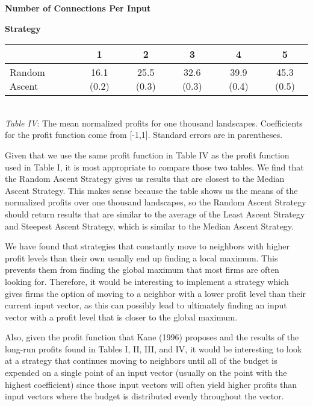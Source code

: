 \begin{center}
\hspace{2cm} \textbf{Number of Connections Per Input}
\begin{flushleft}
\hspace{2.5cm} \textbf{Strategy}
\end{flushleft}
\begin{Schunk}

\begin{tabular}{l|c|c|c|c|c}
\hline
  & 1 & 2 & 3 & 4 & 5\\
\hline
Random Ascent & 16.1 (0.2) & 25.5 (0.3) & 32.6 (0.3) & 39.9 (0.4) & 45.3 (0.5)\\
\hline
\end{tabular}

\end{Schunk}
\\
\emph{Table IV}: The mean normalized profits for one thousand landscapes. Coefficients for the profit function come from [-1,1]. Standard errors are in parentheses.
\end{center}

Given that we use the same profit function in Table IV as the profit
function used in Table I, it is most appropriate to compare those two
tables. We find that the Random Ascent Strategy gives us results that
are closest to the Median Ascent Strategy. This makes sense because the
table shows us the means of the normalized profits over one thousand
landscapes, so the Random Ascent Strategy should return results that are
similar to the average of the Least Ascent Strategy and Steepest Ascent
Strategy, which is similar to the Median Ascent Strategy.

We have found that strategies that constantly move to neighbors with
higher profit levels than their own usually end up finding a local
maximum. This prevents them from finding the global maximum that most
firms are often looking for. Therefore, it would be interesting to
implement a strategy which gives firms the option of moving to a
neighbor with a lower profit level than their current input vector, as
this can possibly lead to ultimately finding an input vector with a
profit level that is closer to the global maximum.

Also, given the profit function that Kane (1996) proposes and the
results of the long-run profits found in Tables I, II, III, and IV, it
would be interesting to look at a strategy that continues moving to
neighbors until all of the budget is expended on a single point of an
input vector (usually on the point with the highest coefficient) since
those input vectors will often yield higher profits than input vectors
where the budget is distributed evenly throughout the vector.

